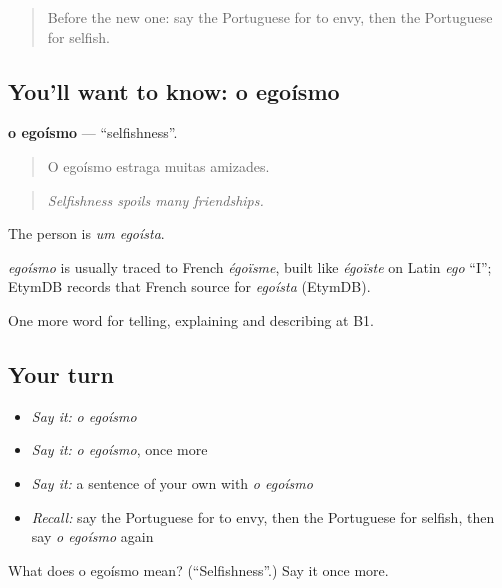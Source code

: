 \label{lesson:PT-C468-egoismo}



\begin{quote}
Before the new one: say the Portuguese for to envy, then the Portuguese for selfish.
\end{quote}

\subsection*{You'll want to know: o egoísmo}
\textbf{o egoísmo} — \textquotedblleft{}selfishness\textquotedblright{}.

\begin{quote}
O egoísmo estraga muitas amizades.
\end{quote}

\begin{quote}
\emph{Selfishness spoils many friendships.}
\end{quote}

The person is \emph{um egoísta}.

\begin{cousinweb}
\emph{egoísmo} is usually traced to French \emph{égoïsme}, built like \emph{égoïste} on Latin \emph{ego} \textquotedblleft{}I\textquotedblright{}; EtymDB records that French source for \emph{egoísta} (EtymDB).
\end{cousinweb}

\begin{grammarlens}[title={What you've built}]
One more word for telling, explaining and describing at B1.
\end{grammarlens}

\subsection*{Your turn}
\begin{itemize}
\raggedright
  \item \emph{Say it:} \emph{o egoísmo}
  \item \emph{Say it:} \emph{o egoísmo}, once more
  \item \emph{Say it:} a sentence of your own with \emph{o egoísmo}
  \item \emph{Recall:} say the Portuguese for to envy, then the Portuguese for selfish, then say \emph{o egoísmo} again
\end{itemize}

\begin{tcolorbox}[breakable,colback=teal!4,colframe=teal!35!black,title={Before you move on}]
What does o egoísmo mean? (\textquotedblleft{}Selfishness\textquotedblright{}.) Say it once more.
\end{tcolorbox}

